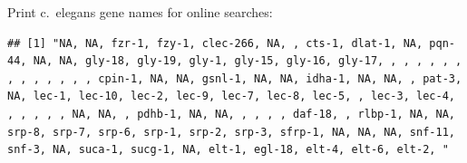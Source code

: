 \documentclass[
]{article}
\newenvironment{Shaded}{\begin{snugshade}}{\end{snugshade}}
\newcommand{\DataTypeTok}[1]{\textcolor[rgb]{0.13,0.29,0.53}{#1}}
\newcommand{\KeywordTok}[1]{\textcolor[rgb]{0.13,0.29,0.53}{\textbf{#1}}}
\newcommand{\NormalTok}[1]{#1}
\newcommand{\OperatorTok}[1]{\textcolor[rgb]{0.81,0.36,0.00}{\textbf{#1}}}
\newcommand{\StringTok}[1]{\textcolor[rgb]{0.31,0.60,0.02}{#1}}
\begin{document}
Print c.~elegans gene names for online searches:

\begin{Shaded}
\end{Shaded}

\begin{verbatim}
## [1] "NA, NA, fzr-1, fzy-1, clec-266, NA, , cts-1, dlat-1, NA, pqn-44, NA, NA, gly-18, gly-19, gly-1, gly-15, gly-16, gly-17, , , , , , , , , , , , , , cpin-1, NA, NA, gsnl-1, NA, NA, idha-1, NA, NA, , pat-3, NA, lec-1, lec-10, lec-2, lec-9, lec-7, lec-8, lec-5, , lec-3, lec-4, , , , , , NA, NA, , pdhb-1, NA, NA, , , , , daf-18, , rlbp-1, NA, NA, srp-8, srp-7, srp-6, srp-1, srp-2, srp-3, sfrp-1, NA, NA, NA, snf-11, snf-3, NA, suca-1, sucg-1, NA, elt-1, egl-18, elt-4, elt-6, elt-2, "
\end{verbatim}
\end{document}
